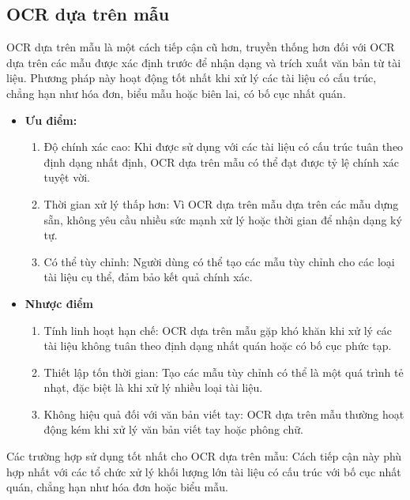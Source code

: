 \subsection{OCR dựa trên mẫu}
OCR dựa trên mẫu là một cách tiếp cận cũ hơn, truyền thống hơn đối với OCR dựa trên các mẫu được xác định trước để nhận dạng và trích xuất văn bản từ tài liệu. Phương pháp này hoạt động tốt nhất khi xử lý các tài liệu có cấu trúc, chẳng hạn như hóa đơn, biểu mẫu hoặc biên lai, có bố cục nhất quán. \cite{template-ai-ocr}
\begin{itemize}
    \item[] \textbf{Ưu điểm:} \begin{enumerate}
            \item Độ chính xác cao: Khi được sử dụng với các tài liệu có cấu trúc tuân theo định dạng nhất định, OCR dựa trên mẫu có thể đạt được tỷ lệ chính xác tuyệt vời.
            \item Thời gian xử lý thấp hơn: Vì OCR dựa trên mẫu dựa trên các mẫu dựng sẵn, không yêu cầu nhiều sức mạnh xử lý hoặc thời gian để nhận dạng ký tự.
            \item Có thể tùy chỉnh: Người dùng có thể tạo các mẫu tùy chỉnh cho các loại tài liệu cụ thể, đảm bảo kết quả chính xác.
        \end{enumerate}
    \item[] \textbf{Nhược điểm} \begin{enumerate}
            \item Tính linh hoạt hạn chế: OCR dựa trên mẫu gặp khó khăn khi xử lý các tài liệu không tuân theo định dạng nhất quán hoặc có bố cục phức tạp.
            \item Thiết lập tốn thời gian: Tạo các mẫu tùy chỉnh có thể là một quá trình tẻ nhạt, đặc biệt là khi xử lý nhiều loại tài liệu.
            \item Không hiệu quả đối với văn bản viết tay: OCR dựa trên mẫu thường hoạt động kém khi xử lý văn bản viết tay hoặc phông chữ.
        \end{enumerate}
\end{itemize}

Các trường hợp sử dụng tốt nhất cho OCR dựa trên mẫu: Cách tiếp cận này phù hợp nhất với các tổ chức xử lý khối lượng lớn tài liệu có cấu trúc với bố cục nhất quán, chẳng hạn như hóa đơn hoặc biểu mẫu.

